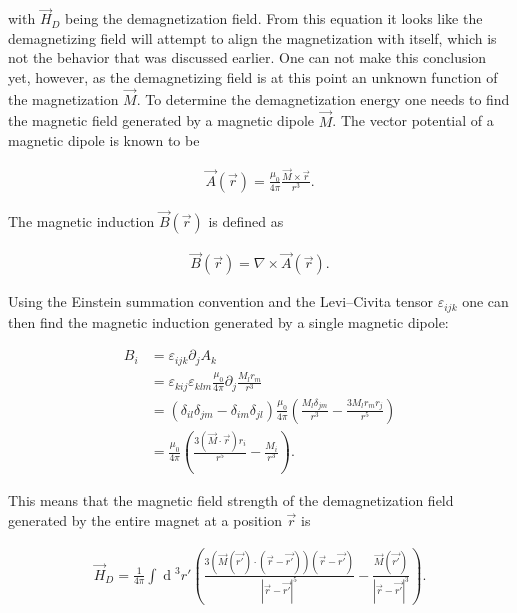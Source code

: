 \documentclass[1p]{elsarticle}		%
\renewcommand{\d}[1]{\ensuremath{\operatorname{d}\!{#1}}}
\numberwithin{equation}{section}
\begin{document}
with $\vec{H}_D$ being the demagnetization field. From this equation it looks like the demagnetizing field will attempt to align the magnetization with itself, which is not the behavior that was discussed earlier. One can not make this conclusion yet, however, as the demagnetizing field is at this point an unknown function of the magnetization $\vec{M}$. To determine the demagnetization energy one needs to find the magnetic field generated by a magnetic dipole $\vec{M}$. The vector potential of a magnetic dipole is known to be

\begin{align}
\vec{A}(\vec{r}) = \frac{\mu_0}{4\pi}\frac{\vec{M}\times\vec{r}}{r^3}.
\end{align} 

The magnetic induction $\vec{B}(\vec{r})$ is defined as

\begin{align}
\vec{B}(\vec{r}) = \nabla \times \vec{A}(\vec{r}).
\end{align}

Using the Einstein summation convention and the Levi--Civita tensor $\varepsilon_{ijk}$ one can then find the magnetic induction generated by a single magnetic dipole:

\begin{align*}
B_i &= \varepsilon_{ijk} \partial_j A_k \\
&= \varepsilon_{kij}\varepsilon_{klm} \frac{\mu_0}{4\pi}\partial_j\frac{M_l r_m}{r^3} \\
&= (\delta_{il}\delta_{jm}-\delta_{im}\delta_{jl})\frac{\mu_0}{4\pi}(\frac{M_l\delta_{jm}}{r^3}-\frac{3M_lr_mr_j}{r^5}) \\
&= \frac{\mu_0}{4\pi}(\frac{3(\vec{M}\cdot\vec{r})r_i}{r^5}-\frac{M_i}{r^3}).
\end{align*}

This means that the magnetic field strength of the demagnetization field generated by the entire magnet at a position $\vec{r}$ is

\begin{align}
\label{eq:demagfield}
\vec{H}_D = \frac{1}{4\pi} \int \d {^3}r' (\frac{3(\vec{M}(\vec{r'}) \cdot (\vec{r}-\vec{r'})) (\vec{r}-\vec{r'})}{|\vec{r}-\vec{r'}|^5}-\frac{\vec{M} (\vec{r'})}{|\vec{r}-\vec{r'}|^3}).
\end{align}
\end{document}
